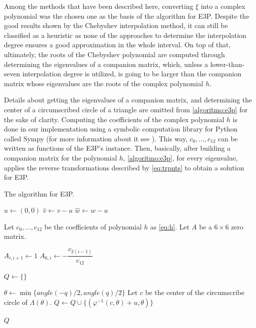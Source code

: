 Among the methods that have been described here, converting $\xi$ into a complex polynomial was the chosen one as the basis of the algorithm for E3P.
Despite the good results shown by the Chebyshev interpolation method,
it can still be classified as a heuristic as none of the approaches to determine the interpolation degree ensures a good approximation in the whole interval.
On top of that, ultimately, the roots of the Chebyshev polynomial are computed through determining the eigenvalues of a companion matrix, which, unless a lower-than-seven interpolation degree is utilized, is going to be larger than the companion matrix whose eigenvalues are the roots of the complex polynomial $h$.

Details about getting the eigenvalues of a companion matrix, and determining the center of a circumscribed circle of a triangle are omitted from \autoref{algoritmo:e3p} for the sake of clarity. 
Computing the coefficients of the complex polynomial $h$ is done in our implementation using a symbolic computation library for Python called Sympy (for more information about it see ). This way, $c_0, \dots, c_{12}$ can be written as functions of the E3P's instance. Then, basically, after building a companion matrix for the polynomial $h$, \autoref{algoritmo:e3p}, for every eigenvalue, applies the reverse transformations described by \autoref{eq:trpnts} to obtain a solution for E3P.

\begin{algoritmo}
	\caption{The algorithm for E3P.}\label{algoritmo:e3p}
	\begin{algorithmic}[1]
		
		\item[]
		
		
		\State $\hat{u}\gets (0,0)$ 
		\State $\hat{v} \gets v-u$
		\State $\hat{w} \gets w-u$
		
		\State Let $c_0, \dots, c_{12}$ be the coefficients of polynomial $h$ as \autoref{eq:h}.
		\State Let $A$ be a $6\times6$ zero matrix.
		
			\State $A_{i,i+1} \gets 1$
			\State $A_{6,i} \gets -\dfrac{c_{2(i-1)}}{c_{12}}$
		\EndFor

		
		\State $Q \gets \{\}$
		
		 
		\State $\theta\gets \min\{angle(-q)/2, angle(q)/2\}$
			\State Let $c$ be the center of the circumscribe circle of $\Lambda(\theta)$.
			\State $Q \gets Q\cup \{(\varphi^{-1}(c, \theta)+u, \theta)\}$
		\EndIf
		\EndFor
				
		\State \Return $Q$
		\EndProcedure
	\end{algorithmic}
\end{algoritmo}

